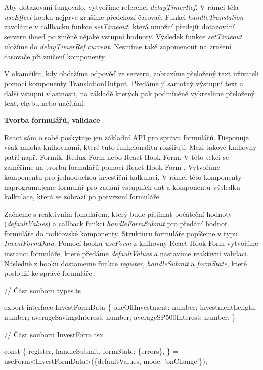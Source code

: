 Aby dotazování fungovalo, vytvoříme referenci \emph{delayTimerRef}. V rámci těla \emph{useEffect} hooku nejprve zrušíme předchozí časovač. 
Funkci \emph{handleTranslation} zavoláme v callbacku funkce \emph{setTimeout}, která umožní předejít dotazování serveru ihned po změně nějaké vstupní hodnoty. 
Výsledek funkce \emph{setTimeout} uložíme do \emph{delayTimerRef.current}. Nesmíme také zapomenout na zrušení časovače při zničení komponenty.

V okamžiku, kdy obdržíme odpověď ze serveru, zobrazíme přeložený text uživateli pomocí komponenty TranslationOutput. 
Předáme jí samotný výstupní text a další vstupní vlastnosti, na základě kterých pak podmíněně vykreslíme přeložený text, chybu nebo načítání.

\begin{flushleft}
  \textbf{Tvorba formulářů, validace}
\end{flushleft}

React sám o sobě poskytuje jen základní API pro správu formulářů. Disponuje však mnoha knihovnami, které tuto funkcionalitu rozšiřují. 
Mezi takové knihovny patří např. Formik, Redux Form nebo React Hook Form. V této sekci se zaměříme na tvorbu formulářů pomocí React Hook Form \cite{reacthookformlib}. 
Vytvoříme komponentu pro jednoduchou investiční kalkulaci. 
V rámci této komponenty naprogramujeme formulář pro zadání vstupních dat a komponentu výsledku kalkulace, která se zobrazí po potvrzení formuláře.

Začneme s reaktivním fomulářem, který bude přijímat počáteční hodnoty (\emph{defaultValues}) a callback funkci \emph{handleFormSubmit} pro předání hodnot formuláře do rodičovské komponenty. 
Strukturu formuláře popíšeme v typu \emph{InvestFormData}. Pomocí hooku \emph{useForm} z knihovny React Hook Form vytvoříme instanci formuláře, které předáme \emph{defaultValues} a nastavíme reaktivní validaci. 
Následně z hooku dostameme funkce \emph{register}, \emph{handleSubmit} a \emph{formState}, které poslouží ke správě formuláře.

\begin{prog}
// Část souboru types.ts

export interface InvestFormData \{
  oneOffInvestment: number;
  investmentLength: number;
  averageSavingsInterest: number;
  averageSP500Interest: number;
\}

// Část souboru InvestForm.tsx

const \{
  register,
  handleSubmit,
  formState: \{errors\},
\} = useForm<InvestFormData>(\{defaultValues, mode: 'onChange'\});
\end{prog}

